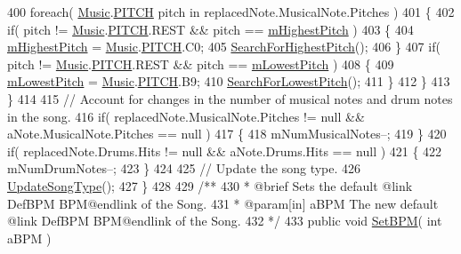 \begin{DoxyCodeInclude}
400             \textcolor{keywordflow}{foreach}( \hyperlink{class_music}{Music}.\hyperlink{group___music_enums_ga508f69b199ea518f935486c990edac1d}{PITCH} pitch in replacedNote.MusicalNote.Pitches )
401             \{
402                 \textcolor{keywordflow}{if}( pitch != \hyperlink{class_music}{Music}.\hyperlink{group___music_enums_ga508f69b199ea518f935486c990edac1d}{PITCH}.REST && pitch == 
      \hyperlink{group___song_priv_var_ga2dcd39d9add609e9df56a94057441dcc}{mHighestPitch} )
403                 \{
404                     \hyperlink{group___song_priv_var_ga2dcd39d9add609e9df56a94057441dcc}{mHighestPitch} = \hyperlink{class_music}{Music}.\hyperlink{group___music_enums_ga508f69b199ea518f935486c990edac1d}{PITCH}.C0;
405                     \hyperlink{group___song_priv_func_ga5f837e6b7f576732fa38747caa057621}{SearchForHighestPitch}();
406                 \}
407                 \textcolor{keywordflow}{if}( pitch != \hyperlink{class_music}{Music}.\hyperlink{group___music_enums_ga508f69b199ea518f935486c990edac1d}{PITCH}.REST && pitch == \hyperlink{group___song_priv_var_ga293976ef4c2050687a81edfbf77b4fc1}{mLowestPitch} )
408                 \{
409                     \hyperlink{group___song_priv_var_ga293976ef4c2050687a81edfbf77b4fc1}{mLowestPitch} = \hyperlink{class_music}{Music}.\hyperlink{group___music_enums_ga508f69b199ea518f935486c990edac1d}{PITCH}.B9;
410                     \hyperlink{group___song_priv_func_gac2e812c6385529eb7a9be5082c7bde75}{SearchForLowestPitch}();
411                 \}
412             \}
413         \}
414 
415         \textcolor{comment}{// Account for changes in the number of musical notes and drum notes in the song.}
416         \textcolor{keywordflow}{if}( replacedNote.MusicalNote.Pitches != null && aNote.MusicalNote.Pitches == null )
417         \{
418             mNumMusicalNotes--;
419         \}
420         \textcolor{keywordflow}{if}( replacedNote.Drums.Hits != null && aNote.Drums.Hits == null )
421         \{
422             mNumDrumNotes--;
423         \}
424 
425         \textcolor{comment}{// Update the song type.}
426         \hyperlink{group___song_priv_func_ga9a1d6eba1576c3631d3c0331196d9ae2}{UpdateSongType}();
427     \}
428 \textcolor{comment}{}
429 \textcolor{comment}{    /**}
430 \textcolor{comment}{     * @brief Sets the default @link DefBPM BPM@endlink of the Song.}
431 \textcolor{comment}{     * @param[in] aBPM The new default @link DefBPM BPM@endlink of the Song.}
432 \textcolor{comment}{    */}
433     \textcolor{keyword}{public} \textcolor{keywordtype}{void} \hyperlink{group___song_pub_func_gaa65bbba1af7192edff7e0f848029013b}{SetBPM}( \textcolor{keywordtype}{int} aBPM )

\end{DoxyCodeInclude}
